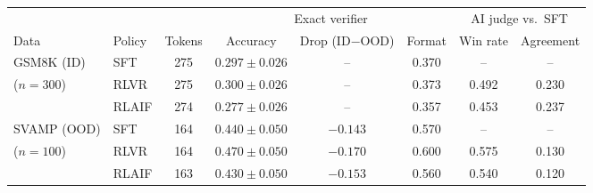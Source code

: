 \begin{adjustbox}{max width=\linewidth}
\begin{tabular}{llcccccc}
\toprule
 & & & \multicolumn{3}{c}{Exact verifier} & \multicolumn{2}{c}{AI judge vs.\ SFT} \\
\cmidrule(lr){4-6} \cmidrule(lr){7-8}
Data & Policy & Tokens & Accuracy & Drop (ID$-$OOD) & Format & Win rate & Agreement \\
\midrule
GSM8K (ID) & SFT & 275 & $0.297 \pm 0.026$ & -- & 0.370 & -- & -- \\
($n = 300$) & RLVR & 275 & $0.300 \pm 0.026$ & -- & 0.373 & 0.492 & 0.230 \\
 & RLAIF & 274 & $0.277 \pm 0.026$ & -- & 0.357 & 0.453 & 0.237 \\
\midrule
SVAMP (OOD) & SFT & 164 & $0.440 \pm 0.050$ & $-0.143$ & 0.570 & -- & -- \\
($n = 100$) & RLVR & 164 & $0.470 \pm 0.050$ & $-0.170$ & 0.600 & 0.575 & 0.130 \\
 & RLAIF & 163 & $0.430 \pm 0.050$ & $-0.153$ & 0.560 & 0.540 & 0.120 \\
\bottomrule
\end{tabular}
\end{adjustbox}
